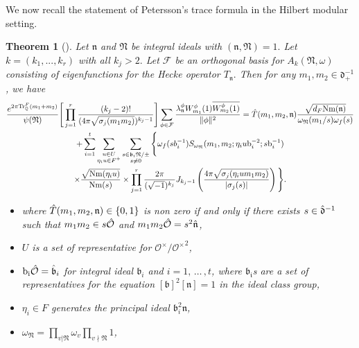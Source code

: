 \documentclass[reqno]{amsart}
\theoremstyle{plain}
\newtheorem{theorem}{Theorem}
\theoremstyle{definition}
\theoremstyle{remark}
\def\Nr{\mathrm{Nm}}
\begin{document}
We now recall the statement of Petersson's trace formula in the Hilbert modular setting. 
\begin{theorem}[{{\cite[Thm.\ 5.11]{KL}}}]\label{Petersson-Trace-Formula}
Let $\mathfrak{n}$ and $\mathfrak{N}$ be integral ideals with $(\mathfrak{n},\mathfrak{N})=1.$ Let $k=(k_1,...,k_r)$ with all $k_j>2.$ Let $\mathcal{F}$ be an orthogonal basis for $A_{k}(\mathfrak{N},\omega)$ consisting of eigenfunctions for the Hecke operator $T_\mathfrak{n}.$ Then for any $m_1,m_2\in \mathfrak{d}_+^{-1}$, we have 
\begin{multline}  \label{PTF}
\frac{e^{2\pi \mathrm{Tr}_{\mathbb{Q}}^F (m_1+m_2)}}{{\psi(\mathfrak{N})}} \Bigg[\prod_{j=1}^r  \frac{(k_j-2)!}{(4\pi \sqrt{\sigma_j(m_1m_2)})^{k_j-1}}\Bigg] \sum_{{\phi}\in \mathcal{F} } \frac{\lambda^\phi_\mathfrak{n} W_{m_1}^\phi(1) \overline{W_{m_2}^\phi(1)}}{\| \phi \|^2} 
=  \Hat{T}(m_1,m_2,\mathfrak{n}) \frac{\sqrt{d_F\Nr(\mathfrak{n})}}{\omega_\mathfrak{N}(m_1/s)\omega_{f}(s)} \\
+ \sum_{i=1}^t\sum_{\substack{u\in U \\ \eta_i u\in F^+}} \sum_{\substack{s\in \mathfrak{b_i}\mathfrak{N}/\pm \\ s\neq 0 }} \Bigg\{ \omega_{f}(sb_i^{-1} ) S_{\omega_\mathfrak{N}} (m_1,m_2;\eta_i u \mathrm{b}_i^{-2};s\mathrm{b}_i^{-1})  \\
 \times  \frac{\sqrt{\Nr(\eta_i u)}}{\Nr(s)} \times\prod_{j=1}^r\frac{2\pi}{(\sqrt{-1})^{k_j}}J_{k_j-1} \left(  \frac{4 \pi\sqrt{\sigma_j (\eta_i u m_1m_2 )}}{|\sigma_j(s)|} \right) \Bigg\}.
\end{multline}  
 

\begin{itemize}
     \item where $\Hat{T}(m_1,m_2,\mathfrak{n})\in \{0,1\}$ is non zero if and only if there exists $s\in \Hat{\mathfrak{d}}^{-1}$ such that $m_1m_2
\in  s\Hat{\mathcal{O}}   $ and $m_1m_2 \Hat{\mathcal{O}}=s^2\Hat{\mathfrak{n}}$,
        \item $U$ is a set of representative for $\mathcal{O}^\times/{\mathcal{O}^\times}^2$,
        \item $\mathrm{b_i}\Hat{\mathcal{O}}=\Hat{\mathfrak{b}}_i$ for integral ideal $\mathfrak{b}_i$  and $i=1,\,\dots\,,t  $, where $\mathfrak{b_i}$s are a set of representatives for the equation $[\mathfrak{b}]^2[\mathfrak{n}]=1$ in the ideal class group,  
        \item $\eta_i\in F$ generates the principal ideal $\mathfrak{b}_i^2\mathfrak{n}$,
        \item $\omega_\mathfrak{N}=\prod_{v|\mathfrak{N}}\omega_v \prod_{v \nmid \mathfrak{N}} 1$,
    \end{itemize}
    
   \end{theorem} 
    
\end{document}

